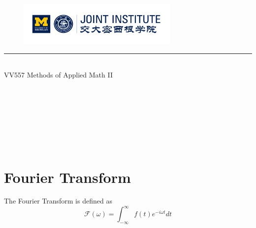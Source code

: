 \documentclass{article}
\begin{document}
\setmainfont{Cormorant Upright}
\renewcommand\arraystretch{1.5}


\thispagestyle{empty}

\begin{center}
\begin{large}
\begin{figure}[!htbp]
\centering
\includegraphics[width=0.7\textwidth]{Logo2}
\end{figure}
\hrule
\vspace*{0.25cm}
 \\
\Large  VV557 Methods of Applied Math II\\
\end{large}
\hrulefill

\vspace*{2cm}
\begin{Large}
 \\
\end{Large}
\vspace*{2cm}
\begin{Large}
\\
\end{Large}
\vspace*{0.5cm}
\begin{large}
 \\
 \\
 \\
\end{large}
\end{center}
\newpage
\setmainfont{Optima}
\setmonofont{Optima}
\setsansfont{Optima}
\setcounter{page}{1}
\normalsize
\section{Fourier Transform}
The Fourier Transform is defined as 
\[
	\mathcal{F}(\omega)=\int_{-\infty}^{\infty} f(t) e^{-i \omega t} d t
\]
\end{document}
